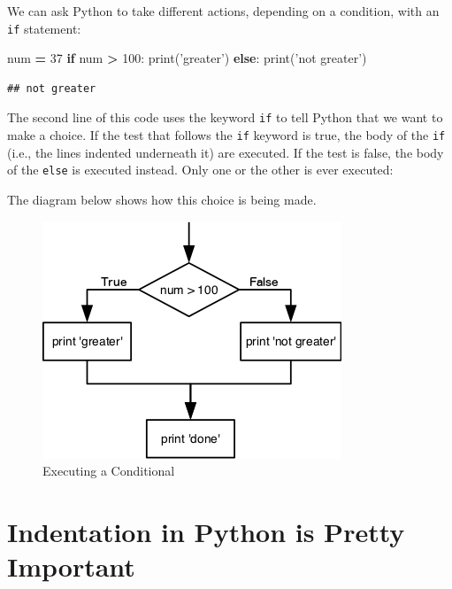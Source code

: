 \documentclass[]{book}
\newenvironment{Shaded}{\begin{snugshade}}{\end{snugshade}}
\newcommand{\BuiltInTok}[1]{#1}
\newcommand{\ControlFlowTok}[1]{\textcolor[rgb]{0.13,0.29,0.53}{\textbf{#1}}}
\newcommand{\DecValTok}[1]{\textcolor[rgb]{0.00,0.00,0.81}{#1}}
\newcommand{\NormalTok}[1]{#1}
\newcommand{\OperatorTok}[1]{\textcolor[rgb]{0.81,0.36,0.00}{\textbf{#1}}}
\newcommand{\StringTok}[1]{\textcolor[rgb]{0.31,0.60,0.02}{#1}}
\theoremstyle{definition}
\theoremstyle{definition}
\theoremstyle{definition}
\theoremstyle{remark}
\begin{document}
We can ask Python to take different actions, depending on a condition,
with an \texttt{if} statement:

\begin{Shaded}
\begin{Highlighting}[]
\NormalTok{num }\OperatorTok{=} \DecValTok{37}
\ControlFlowTok{if}\NormalTok{ num }\OperatorTok{>} \DecValTok{100}\NormalTok{:}
    \BuiltInTok{print}\NormalTok{(}\StringTok{'greater'}\NormalTok{)}
\ControlFlowTok{else}\NormalTok{:}
    \BuiltInTok{print}\NormalTok{(}\StringTok{'not greater'}\NormalTok{)}
\end{Highlighting}
\end{Shaded}

\begin{verbatim}
## not greater
\end{verbatim}

The second line of this code uses the keyword \texttt{if} to tell Python
that we want to make a choice. If the test that follows the \texttt{if}
keyword is true, the body of the \texttt{if} (i.e., the lines indented
underneath it) are executed. If the test is false, the body of the
\texttt{else} is executed instead. Only one or the other is ever
executed:

The diagram below shows how this choice is being made.

\begin{figure}
\centering
\includegraphics{assets/python-flowchart-conditional.png}
\caption{Executing a Conditional}
\end{figure}

\hypertarget{indentation-in-python-is-pretty-important}{%
\section{Indentation in Python is Pretty
Important}\label{indentation-in-python-is-pretty-important}}
\end{document}
